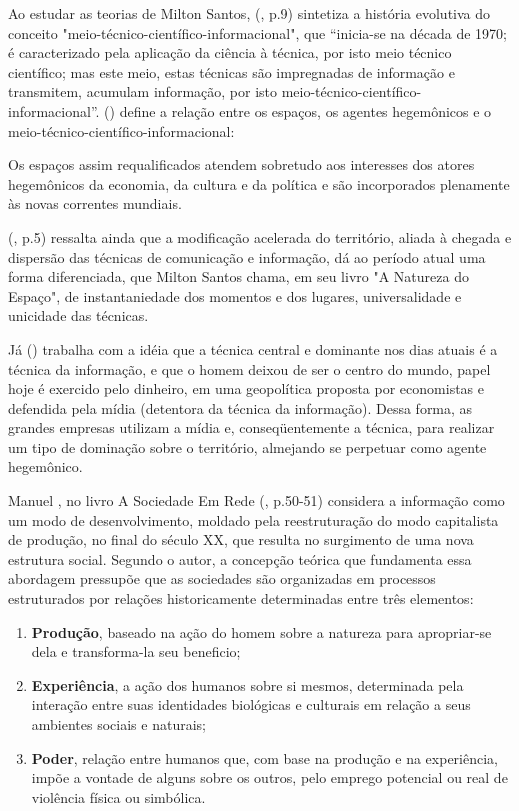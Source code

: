 Ao estudar as teorias de Milton Santos,  (\citeyear{maia}, p.9) sintetiza a história evolutiva do conceito "meio-técnico-científico-informacional", que “inicia-se na década de 1970; é caracterizado pela aplicação da ciência à técnica, por isto meio técnico científico; mas este meio, estas técnicas são impregnadas de informação e transmitem, acumulam informação, por isto meio-técnico-científico-informacional”.  (\citeyear{santos1996}) define a relação entre os espaços, os agentes hegemônicos e o meio-técnico-científico-informacional:

\begin{citacao}
Os espaços assim requalificados atendem sobretudo aos interesses dos atores hegemônicos da economia, da cultura e da política e são incorporados plenamente às novas correntes mundiais. \cite[p. 191]{santos1996}
\end{citacao}

 (\citeyear{maia}, p.5) ressalta ainda que a modificação acelerada do território, aliada à chegada e dispersão das técnicas de comunicação e informação, dá ao período atual uma forma diferenciada, que Milton Santos chama, em seu livro "A Natureza do Espaço", de instantaniedade dos momentos e dos lugares, universalidade e unicidade das técnicas.

Já  (\citeyear{santos2001}) trabalha com a idéia que a técnica central e dominante nos dias atuais é a técnica da informação, e que o homem deixou de ser o centro do mundo, papel hoje é exercido pelo dinheiro, em uma geopolítica proposta por economistas e defendida pela mídia (detentora da técnica da informação). Dessa forma, as grandes empresas utilizam a mídia e, conseqüentemente a técnica, para realizar um tipo de dominação sobre o território, almejando se perpetuar como agente hegemônico.


Manuel , no livro A Sociedade Em Rede (\citeyear{castells1999}, p.50-51) considera a informação como um modo de desenvolvimento, moldado pela reestruturação do modo capitalista de produção, no final do século XX, que resulta no surgimento de uma nova estrutura social. Segundo o autor, a concepção teórica que fundamenta essa abordagem pressupõe que as sociedades são organizadas em processos estruturados por relações historicamente determinadas entre três elementos:

\begin{enumerate}

\item \textbf{Produção}, baseado na ação do homem sobre a natureza para apropriar-se dela e transforma-la seu beneficio;
\item \textbf{Experiência}, a ação dos humanos sobre si mesmos, determinada pela interação entre suas identidades biológicas e culturais em relação a seus ambientes sociais e naturais;
\item \textbf{Poder}, relação entre humanos que, com base na produção e na experiência, impõe a vontade de alguns sobre os outros, pelo emprego potencial ou real de violência física ou simbólica.

\end{enumerate}

